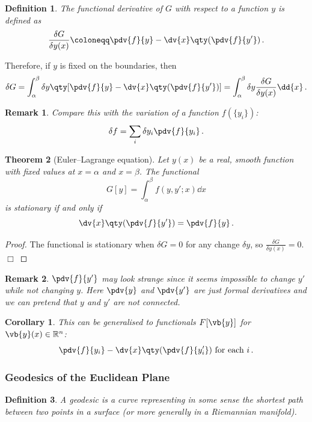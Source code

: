 \documentclass{article}
\theoremstyle{plain}\theoremheaderfont{\normalfont\itshape}\theorembodyfont{\rmfamily}\theoremseparator{.}\newtheorem*{rem}{Remark}\newtheorem*{ex}{Example}\newtheorem*{proof}{Proof}\newtheorem*{altp}{Alternative proof}
\theoremstyle{plain}\theoremheaderfont{\normalfont\bfseries}\theorembodyfont{\rmfamily}\theoremseparator{.}\newtheorem{thm}{Theorem}[section]\newtheorem{lem}[thm]{Lemma}\newtheorem{prop}[thm]{Proposition}\newtheorem*{cor}{Corollary}\newtheorem{defn}[thm]{Definition}\newtheorem{clm}[thm]{Claim}\newtheorem{clminproof}{Claim}
\theoremstyle{break}\theoremheaderfont{\normalfont\itshape}\theorembodyfont{\rmfamily}\theoremseparator{.\medskip}\newtheorem*{proofskip}{Proof}\newtheorem*{exs}{Examples}\newtheorem*{rems}{Remarks}
\theoremstyle{break}\theoremheaderfont{\normalfont\bfseries}\theorembodyfont{\rmfamily}\theoremseparator{.\medskip}\newtheorem{lemskip}[thm]{Lemma}\newtheorem{defnskip}[thm]{Definition}\newtheorem{propskip}[thm]{Proposition}\newtheorem{thmskip}[thm]{Theorem}
\numberwithin{equation}{section}
\newcommand{\qed}{\hfill\ensuremath{\Box}}
\begin{document}
	\begin{defn}
		The \textit{functional derivative} of \(G\) with respect to a function \(y\) is defined as
		\[\frac{\delta G}{\delta y(x)}\coloneqq\pdv{f}{y}-\dv{x}\qty(\pdv{f}{y'})\,.\]
	\end{defn}

	Therefore, if \(y\) is fixed on the boundaries, then
	\[\delta G=\int_{\alpha}^{\beta}\delta y\qty[\pdv{f}{y}-\dv{x}\qty(\pdv{f}{y'})]=\int_{\alpha}^{\beta}\delta y\frac{\delta G}{\delta y(x)}\dd{x}\,.\]

	\begin{rem}
		Compare this with the variation of a function \(f(\{y_i\})\):
		\[\delta f=\sum_i \delta y_i\pdv{f}{y_i}\,.\]
	\end{rem}

	\begin{thm}[Euler--Lagrange equation]		
		Let \(y(x)\) be a real, smooth function with fixed values at \(x=\alpha\) and \(x=\beta\). The functional
		\begin{equation}\tag{\(\dagger\)}
			G[y]=\int_{\alpha}^{\beta}f(y,y';x)\dd{x}
		\end{equation}
		is stationary if and only if
		\[\dv{x}\qty(\pdv{f}{y'})=\pdv{f}{y}\,.\]
	\end{thm}
	\begin{proof}
		The functional is stationary when \(\delta G=0\) for any change \(\delta y\), so \(\frac{\delta G}{\delta y(x)}=0\).\qed
	\end{proof}
	\begin{rem}
		\(\pdv{f}{y'}\) may look strange since it seems impossible to change \(y'\) while not changing \(y\). Here \(\pdv{y}\) and \(\pdv{y'}\) are just formal derivatives and we can pretend that \(y\) and \(y'\) are not connected.
	\end{rem}
	\begin{cor}
		This can be generalised to functionals \(F[\vb{y}]\) for \(\vb{y}(x)\in\mathbb{R}^n\):
		\[\pdv{f}{y_i}-\dv{x}\qty(\pdv{f}{y'_i})\text{ for each }i\,.\]
	\end{cor}

	\subsubsection{Geodesics of the Euclidean Plane}
	\begin{defn}
		A \textit{geodesic} is a curve representing in some sense the shortest path between two points in a surface (or more generally in a \textit{Riemannian manifold}).
	\end{defn}
\end{document}
